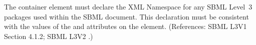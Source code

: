 The  container element must declare the XML Namespace for any
SBML Level~3 packages used within the SBML document.  This declaration must
be consistent with the values of the  and 
attributes on the  element.  (References: SBML L3V1 Section 4.1.2; SBML L3V2
.)

